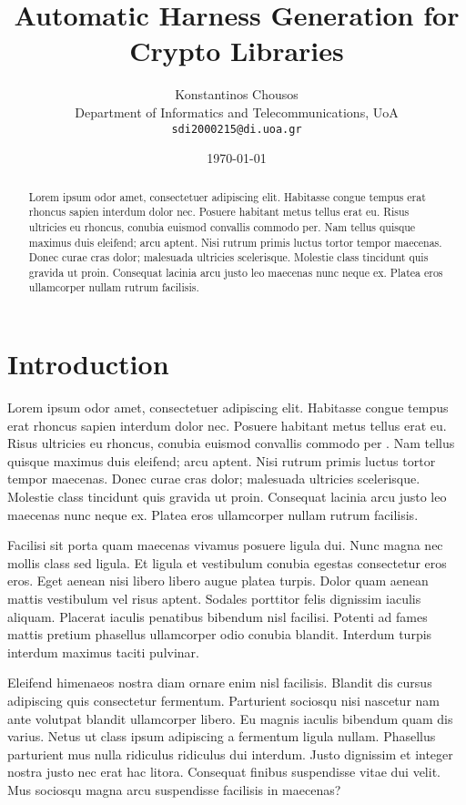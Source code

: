 \documentclass[
  a4paper,
]{article}
\title{Automatic Harness Generation for Crypto Libraries}
\author{ Konstantinos Chousos \\ \small{Department of Informatics and
Telecommunications, UoA} \\ \small{\texttt{sdi2000215@di.uoa.gr}} }
\date{\today}
\begin{document}
\maketitle

\begin{abstract}{}{}%

Lorem ipsum odor amet, consectetuer adipiscing elit. Habitasse congue
tempus erat rhoncus sapien interdum dolor nec. Posuere habitant metus
tellus erat eu. Risus ultricies eu rhoncus, conubia euismod convallis
commodo per. Nam tellus quisque maximus duis eleifend; arcu aptent. Nisi
rutrum primis luctus tortor tempor maecenas. Donec curae cras dolor;
malesuada ultricies scelerisque. Molestie class tincidunt quis gravida
ut proin. Consequat lacinia arcu justo leo maecenas nunc neque ex.
Platea eros ullamcorper nullam rutrum facilisis.

%
\end{abstract}

\section{Introduction}\label{introduction}

Lorem ipsum odor amet, consectetuer adipiscing elit. Habitasse congue
tempus erat rhoncus sapien interdum dolor nec. Posuere habitant metus
tellus erat eu. Risus ultricies eu rhoncus, conubia euismod convallis
commodo per
\autocite{manesArtScienceEngineering2019,yaoTreeThoughtsDeliberate2023}.
Nam tellus quisque maximus duis eleifend; arcu aptent. Nisi rutrum
primis luctus tortor tempor maecenas. Donec curae cras dolor; malesuada
ultricies scelerisque. Molestie class tincidunt quis gravida ut proin.
Consequat lacinia arcu justo leo maecenas nunc neque ex. Platea eros
ullamcorper nullam rutrum facilisis.

Facilisi sit porta quam maecenas vivamus posuere ligula dui. Nunc magna
nec mollis class sed ligula. Et ligula et vestibulum conubia egestas
consectetur eros eros. Eget aenean nisi libero libero augue platea
turpis. Dolor quam aenean mattis vestibulum vel risus aptent. Sodales
porttitor felis dignissim iaculis aliquam. Placerat iaculis penatibus
bibendum nisl facilisi. Potenti ad fames mattis pretium phasellus
ullamcorper odio conubia blandit. Interdum turpis interdum maximus
taciti pulvinar.

Eleifend himenaeos nostra diam ornare enim nisl facilisis. Blandit dis
cursus adipiscing quis consectetur fermentum. Parturient sociosqu nisi
nascetur nam ante volutpat blandit ullamcorper libero. Eu magnis iaculis
bibendum quam dis varius. Netus ut class ipsum adipiscing a fermentum
ligula nullam. Phasellus parturient mus nulla ridiculus ridiculus dui
interdum. Justo dignissim et integer nostra justo nec erat hac litora.
Consequat finibus suspendisse vitae dui velit. Mus sociosqu magna arcu
suspendisse facilisis in maecenas?

\printbibliography
\end{document}
